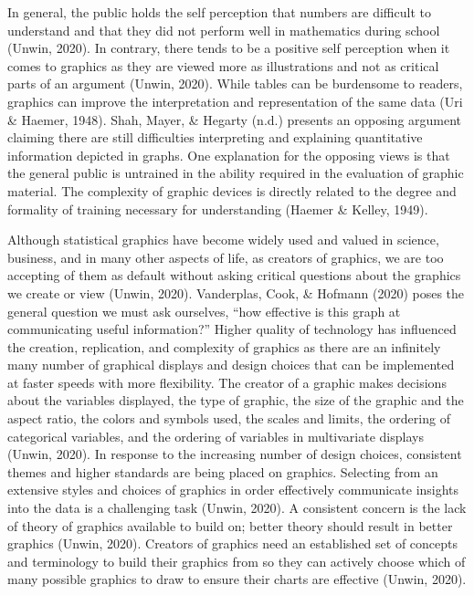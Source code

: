 \documentclass[print]{nuthesis}
\begin{document}
In general, the public holds the self perception that numbers are difficult to understand and that they did not perform well in mathematics during school (Unwin, 2020).
In contrary, there tends to be a positive self perception when it comes to graphics as they are viewed more as illustrations and not as critical parts of an argument (Unwin, 2020).
While tables can be burdensome to readers, graphics can improve the interpretation and representation of the same data (Uri \& Haemer, 1948).
Shah, Mayer, \& Hegarty (n.d.) presents an opposing argument claiming there are still difficulties interpreting and explaining quantitative information depicted in graphs.
One explanation for the opposing views is that the general public is untrained in the ability required in the evaluation of graphic material.
The complexity of graphic devices is directly related to the degree and formality of training necessary for understanding (Haemer \& Kelley, 1949).

Although statistical graphics have become widely used and valued in science, business, and in many other aspects of life, as creators of graphics, we are too accepting of them as default without asking critical questions about the graphics we create or view (Unwin, 2020).
Vanderplas, Cook, \& Hofmann (2020) poses the general question we must ask ourselves, ``how effective is this graph at communicating useful information?''
Higher quality of technology has influenced the creation, replication, and complexity of graphics as there are an infinitely many number of graphical displays and design choices that can be implemented at faster speeds with more flexibility.
The creator of a graphic makes decisions about the variables displayed, the type of graphic, the size of the graphic and the aspect ratio, the colors and symbols used, the scales and limits, the ordering of categorical variables, and the ordering of variables in multivariate displays (Unwin, 2020).
In response to the increasing number of design choices, consistent themes and higher standards are being placed on graphics.
Selecting from an extensive styles and choices of graphics in order effectively communicate insights into the data is a challenging task (Unwin, 2020).
A consistent concern is the lack of theory of graphics available to build on; better theory should result in better graphics (Unwin, 2020).
Creators of graphics need an established set of concepts and terminology to build their graphics from so they can actively choose which of many possible graphics to draw to ensure their charts are effective (Unwin, 2020).
\end{document}
